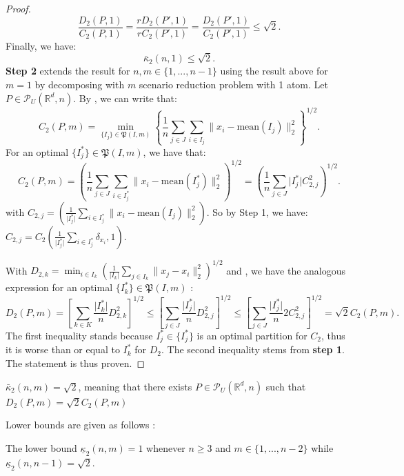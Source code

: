\documentclass{amsart}
\newcommand{\RR}{\mathbb{R}}
\begin{document}
\begin{proof}
$$
\frac{D_2\left(P,1\right)}{C_2\left(P,1\right)}=\frac{rD_2\left(P',1\right)}{rC_2\left(P',1\right)}=\frac{D_2\left(P',1\right)}{C_2\left(P',1\right)}\leq \sqrt{2}.
$$
Finally, we have: $$\bar\kappa_2\left(n,1\right)\leq\sqrt{2}.$$
\newline
\textbf{Step 2} extends the result for $n,m\in\{1,...,n-1\}$ using the result above for $m=1$ by decomposing with $m$ scenario reduction problem with 1 atom. Let $P\in\mathcal{P}_U\left(\RR^d,n\right). $ By , we can write that:
$$
C_2\left(P,m\right)=\min_{\{I_j\}\in \mathfrak{P}(I,m)}\left\{ \frac{1}{n}\sum_{j\in J}\sum_{i\in I_j}\lVert x_i-\text{mean}\left(I_j\right)\rVert^2_2 \right\}^{1/2}.
$$
For an optimal $\{I_j^*\}\in\mathfrak{P}\left(I,m\right)$, we have that:
$$
C_2\left(P,m\right)=\left(\frac{1}{n}\sum_{j\in J}\sum_{i\in I_j^*} \lVert x_i-\text{mean}\left(I_j^*\right)\rVert^2_2\right)^{1/2}=\left(\frac{1}{n}\sum_{j\in J}\lvert I_j^*\rvert C^2_{2,j}\right)^{1/2}.
$$
with $C_{2,j}=\left(\frac{1}{\lvert I_j^*\rvert}\sum_{i\in I_j^*}\lVert x_i -\text{mean}\left(I_j\right)\rVert^2_2\right)$. So by Step 1, we have: $C_{2,j}=C_2\left(\frac{1}{\lvert I_j^*\rvert}\sum_{i\in I_j^*}\delta_{x_i},1\right)$.

\noindent With $D_{2,k}=\min_{i\in I_k}\left(\frac{1}{\lvert I_k\rvert}\sum_{j\in I_k}\lVert x_j -x_i\rVert^2_2\right)^{1/2}$ and , we have the analogous expression for an optimal $\{I_k^*\}\in\mathfrak{P}\left(I,m\right)$ : 
$$
D_2\left(P,m\right)=\left[ \sum_{k\in K}\frac{\lvert I_k^*\rvert}{n}D_{2,k}^2\right]^{1/2}\leq \left[ \sum_{j\in J}\frac{\lvert I_j^*\rvert}{n}D_{2,j}^2\right]^{1/2}\leq \left[ \sum_{j\in J}\frac{\lvert I_j^*\rvert}{n}2C_{2,j}^2\right]^{1/2}=\sqrt{2}C_2\left(P,m\right).
$$
The first inequality stands because $I_j^*\in\{I_j^*\}$ is an optimal partition for $C_2$, thus it is worse than or equal to $I_k^*$ for $D_2$. The second inequality stems from \textbf{step 1}. The statement is thus proven.
\end{proof}
\begin{proposition}
    $\bar\kappa_2\left(n,m\right)=\sqrt{2}$, meaning that there exists $P\in\mathcal{P}_U\left(\RR^d,n\right)$ such that $D_2\left(P,m\right)=\sqrt{2}C_2\left(P,m\right)$
\end{proposition}

Lower bounds are given as follows : 
\begin{proposition}
    The lower bound $\underline\kappa_2\left(n,m\right)=1$ whenever $n\geq3$ and $m\in\{1,...,n-2\}$ while $\underline\kappa_2\left(n,n-1\right)=\sqrt{2}.$
\end{proposition}
\end{document}
